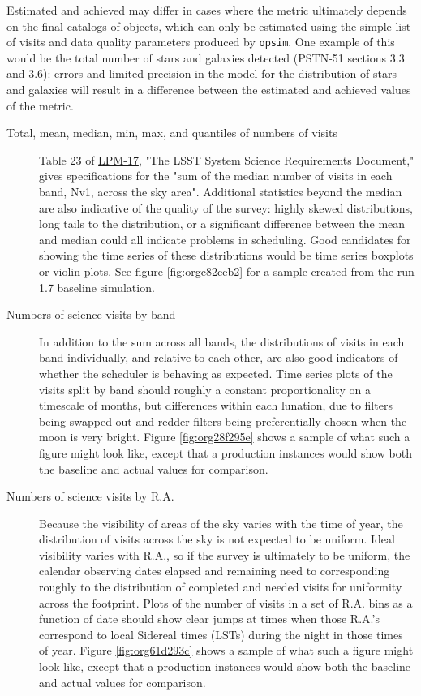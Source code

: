 Estimated and achieved may differ in cases where the metric ultimately depends on the final catalogs of objects, which can only be estimated using the simple list of visits and data quality parameters produced by \texttt{opsim}.
One example of this would be the total number of stars and galaxies detected (PSTN-51 sections 3.3 and 3.6): errors and limited precision in the model for the distribution of stars and galaxies will result in a difference between the estimated and achieved values of the metric.

\begin{description}
\item[{Total, mean, median, min, max, and quantiles of numbers of visits}] Table 23 of \href{http://ls.st/lpm-17}{LPM-17}, "The LSST System Science Requirements Document," gives specifications for the "sum of the median number of visits in each band, Nv1, across the sky area". Additional statistics beyond the median are also indicative of the quality of the survey: highly skewed distributions, long tails to the distribution, or a significant difference between the mean and median could all indicate problems in scheduling. Good candidates for showing the time series of these distributions would be time series boxplots or violin plots. See figure \ref{fig:orgc82ceb2} for a sample created from the run 1.7 baseline simulation.
\item[{Numbers of science visits by band}] In addition to the sum across all bands, the distributions of visits in each band individually, and relative to each other, are also good indicators of whether the scheduler is behaving as expected. Time series plots of the visits split by band should roughly a constant proportionality on a timescale of months, but differences within each lunation, due to filters being swapped out and redder filters being preferentially chosen when the moon is very bright. Figure \ref{fig:org28f295e} shows a sample of what such a figure might look like, except that a production instances would show both the baseline and actual values for comparison.
\item[{Numbers of science visits by R.A.}] Because the visibility of areas of the sky varies with the time of year, the distribution of visits across the sky is not expected to be uniform. Ideal visibility varies with R.A., so if the survey is ultimately to be uniform, the calendar observing dates elapsed and remaining need to corresponding roughly to the distribution of completed and needed visits for uniformity across the footprint. Plots of the number of visits in a set of R.A. bins as a function of date should show clear jumps at times when those R.A.'s correspond to local Sidereal times (LSTs) during the night in those times of year. Figure \ref{fig:org61d293c} shows a sample of what such a figure might look like, except that a production instances would show both the baseline and actual values for comparison.

\end{description}
